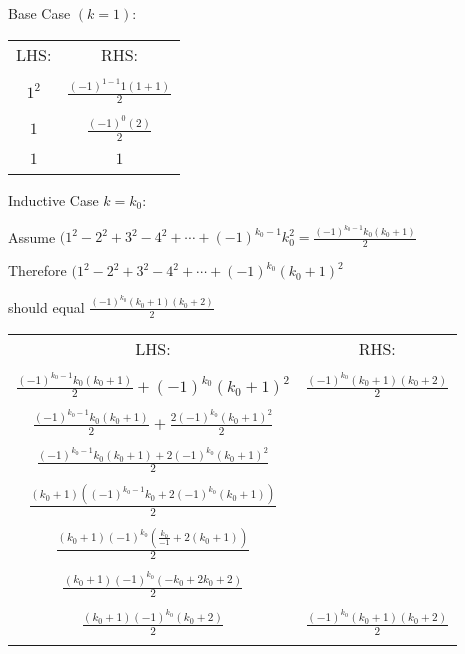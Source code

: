 \documentclass{article}
\begin{document}
\begin{enumerate}
    Base Case $(k=1)$:
    \begin{center}
        \begin{tabular}{ c | c } 
        LHS: & RHS: \\ & \\
        $ 1^2 $ & $ \frac{(-1)^{1-1}1(1+1)}{2} $ \\ \\
        $ 1 $ & $ \frac{(-1)^{0}(2)}{2} $ \\ \\
        $ 1 $ & $ 1 $ \\ \\
        \end{tabular}
    \end{center}
    Inductive Case $ k = k_0 $:
    
        Assume $ (1^2-2^2+3^2-4^2+\cdots+(-1)^{k_0-1}k_0^2 = \frac{(-1)^{k_0-1}k_0(k_0+1)}{2} $

        Therefore $ (1^2-2^2+3^2-4^2+\cdots+(-1)^{k_0}(k_0+1)^2 $ 
        
        should equal $ \frac{(-1)^{k_0}(k_0+1)(k_0+2)}{2} $

    \begin{center}
        \begin{tabular}{ c | c } 
        LHS: & RHS: \\ \\
        $ \frac{(-1)^{k_0-1}k_0(k_0+1)}{2} + (-1)^{k_0}(k_0+1)^2 $ & $ \frac{(-1)^{k_0}(k_0+1)(k_0+2)}{2} $ \\ \\
        $ \frac{(-1)^{k_0-1}k_0(k_0+1)}{2} + \frac{2(-1)^{k_0}(k_0+1)^2}{2} $ &  \\ \\
        $ \frac{(-1)^{k_0-1}k_0(k_0+1) + 2(-1)^{k_0}(k_0+1)^2}{2}  $ &  \\ \\
        $ \frac{(k_0+1)((-1)^{k_0-1}k_0+2(-1)^{k_0}(k_0+1))}{2}  $ &  \\ \\
        $ \frac{(k_0+1)(-1)^{k_0}(\frac{k_0}{-1}+2(k_0+1))}{2}  $ &  \\ \\
        $ \frac{(k_0+1)(-1)^{k_0}(-k_0+2k_0+2)}{2}  $ &  \\ \\
        $ \boxed{\frac{(k_0+1)(-1)^{k_0}(k_0+2)}{2}}  $ &  $\boxed{\frac{(-1)^{k_0}(k_0+1)(k_0+2)}{2}}$\\ \\
        \end{tabular}
    \end{center}
    

\end{enumerate}
\end{document}
